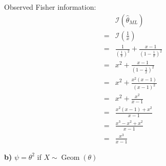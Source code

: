 \documentclass{article}
\begin{document}
\begin{ssolution}
Observed Fisher information:
\begin{align*}
	& \mathcal{I}(\hat{\theta}_{ML}) \\
	=& \mathcal{I}\left(\frac{1}{x}\right) \\
	=& \frac{1}{(\frac{1}{x})^2}+\frac{x-1}{(1-\frac{1}{x})^2} \\
	=& x^2+\frac{x-1}{(1-\frac{1}{x})^2} \\
	=& x^2+\frac{x^2(x-1)}{(x-1)^2} \\
	=& x^2+\frac{x^2}{x-1} \\
	=& \frac{x^2(x-1)+x^2}{x-1} \\
	=& \frac{x^3-x^2+x^2}{x-1} \\
	=& \frac{x^3}{x-1}
\end{align*}
\end{ssolution}

\begin{ssubproblem}
\textbf{b)}
\(\psi=\theta^2\) if \(X \sim \operatorname{Geom}(\theta)\)
\end{ssubproblem}
\end{document}
